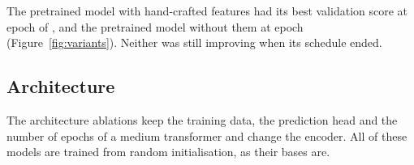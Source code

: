 \documentclass[11pt]{article}
\begin{document}
The pretrained model with hand-crafted features had its best validation
score at epoch  of
, and the pretrained model
without them at epoch 
(Figure~\ref{fig:variants}). Neither was still improving when its schedule
ended.
\fi

\ifshapes
\subsection{Architecture}

The architecture ablations keep the training data, the prediction head and
the number of epochs of a medium transformer and change the encoder. All of
these models are trained from random initialisation, as their bases are.
\end{document}
